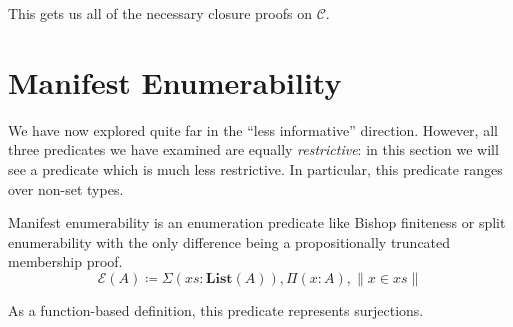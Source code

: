 This gets us all of the necessary closure proofs on \(\mathcal{C}\).
\section{Manifest Enumerability} \label{manifest-enumerability}
We have now explored quite far in the ``less informative'' direction.
However, all three predicates we have examined are equally \emph{restrictive}:
in this section we will see a predicate which is much less restrictive.
In particular, this predicate ranges over non-set types.


\begin{definition}
  Manifest enumerability is an enumeration predicate like Bishop finiteness or
  split enumerability with the only difference being a propositionally truncated
  membership proof.
  \begin{equation}
    \mathcal{E}(A) \coloneqq \Sigma {(\mathit{xs} : \mathbf{List}(A))} , \Pi {(x : A)} , \lVert x \in \mathit{xs} \rVert
  \end{equation}
\end{definition}
As a function-based definition, this predicate represents surjections.

